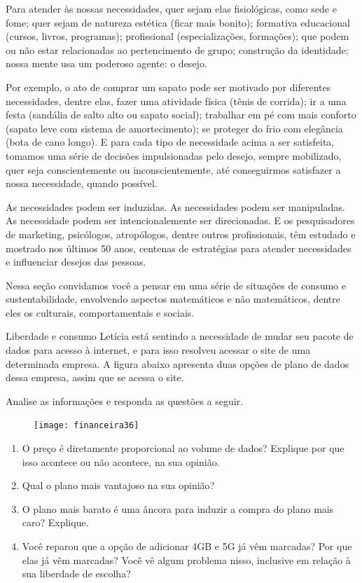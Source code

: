 
Para atender às nossas necessidades, quer sejam elas fisiológicas, como sede e fome; quer sejam de natureza estética (ficar mais bonito); formativa educacional (cursos, livros, programas); profissional (especializações, formações); que podem ou não estar relacionadas ao pertencimento de grupo; construção da identidade; nossa mente usa um poderoso agente: o desejo.

Por exemplo, o ato de comprar um sapato pode ser motivado por diferentes necessidades, dentre elas, fazer uma atividade física (tênis de corrida); ir a uma festa (sandália de salto alto ou sapato social); trabalhar em pé com mais conforto (sapato leve com sistema de amortecimento); se proteger do frio com elegância (bota de cano longo). E para cada tipo de necessidade acima a ser satisfeita, tomamos uma série de decisões impulsionadas pelo desejo, sempre mobilizado, quer seja conscientemente ou inconscientemente, até conseguirmos satisfazer a nossa necessidade, quando possível.

As necessidades podem ser induzidas. As necessidades podem ser manipuladas. As necessidade podem ser intencionalemente ser direcionadas. E os pesquisadores de marketing, psicólogos, atropólogos, dentre outros profissionais, têm estudado e mostrado nos últimos 50 anos, centenas de estratégias para atender necessidades e influenciar desejos das pessoas.

Nessa seção convidamos você a pensar em uma série de situações de consumo e sustentabilidade, envolvendo aspectos matemáticos e não matemáticos, dentre eles os culturais, comportamentais e sociais.

\begin{task}{Liberdade e consumo}
\label{liberdade-consumo}
Letícia está sentindo a necessidade de mudar seu pacote de dados para acesso à internet, e para isso resolveu acessar o site de uma determinada empresa. A figura abaixo apresenta duas opções de plano de dados dessa empresa, assim que se acessa o site.

Analise as informações e responda as questões a seguir.

\begin{figure}[H]
\centering

\texttt{[image: financeira36]}
\end{figure}

\begin{enumerate}
  \item O preço é diretamente proporcional ao volume de dados? Explique por que isso acontece ou não acontece, na sua opinião.
  \item Qual o plano mais vantajoso na sua opinião?
  \item O plano mais barato é uma âncora para induzir a compra do plano mais caro? Explique.
  \item Você reparou que a opção de adicionar 4GB e 5G já vêm marcadas? Por que elas já vêm marcadas? Você vê algum problema nisso, inclusive em relação à sua liberdade de escolha?
\end{enumerate}
\end{task}

